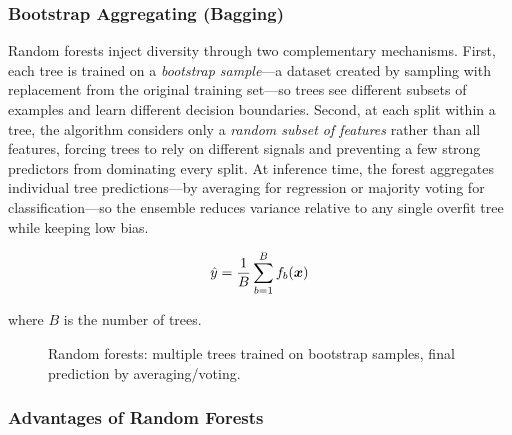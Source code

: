 \subsubsection{Bootstrap Aggregating (Bagging)}

Random forests inject diversity through two complementary mechanisms. First, each tree is trained on a \emph{bootstrap sample}—a dataset created by sampling with replacement from the original training set—so trees see different subsets of examples and learn different decision boundaries. Second, at each split within a tree, the algorithm considers only a \emph{random subset of features} rather than all features, forcing trees to rely on different signals and preventing a few strong predictors from dominating every split. At inference time, the forest aggregates individual tree predictions—by averaging for regression or majority voting for classification—so the ensemble reduces variance relative to any single overfit tree while keeping low bias.

\begin{equation}
\hat{y} = \frac{1}{B} \sum_{b=1}^{B} f_b(\boldsymbol{x})
\end{equation}

where $B$ is the number of trees.

\begin{figure}[htbp]
\centering
{}
\caption{Random forests: multiple trees trained on bootstrap samples, final prediction by averaging/voting.}
\label{fig:random-forest}
\end{figure}

\subsubsection{Advantages of Random Forests}

